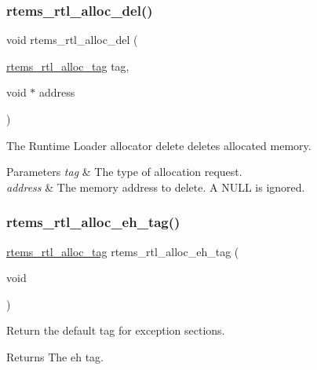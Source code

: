 \subsubsection{\texorpdfstring{rtems\_rtl\_alloc\_del()}{rtems\_rtl\_alloc\_del()}}
{\footnotesize\ttfamily void rtems\+\_\+rtl\+\_\+alloc\+\_\+del (\begin{DoxyParamCaption}\item[{\mbox{\hyperlink{rtl-allocator_8h_a445a8615118b7fc14005ab20583153fd}{rtems\+\_\+rtl\+\_\+alloc\+\_\+tag}}}]{tag,  }\item[{void $\ast$}]{address }\end{DoxyParamCaption})}

The Runtime Loader allocator delete deletes allocated memory.


\begin{DoxyParams}{Parameters}
{\em tag} & The type of allocation request. \\
\hline
{\em address} & The memory address to delete. A N\+U\+LL is ignored. \\
\hline
\end{DoxyParams}
\mbox{\label{rtl-allocator_8h_ac03f273707eb55ed34a1ebcee8fd4a10}} 
\subsubsection{\texorpdfstring{rtems\_rtl\_alloc\_eh\_tag()}{rtems\_rtl\_alloc\_eh\_tag()}}
{\footnotesize\ttfamily \mbox{\hyperlink{rtl-allocator_8h_a445a8615118b7fc14005ab20583153fd}{rtems\+\_\+rtl\+\_\+alloc\+\_\+tag}} rtems\+\_\+rtl\+\_\+alloc\+\_\+eh\+\_\+tag (\begin{DoxyParamCaption}\item[{void}]{ }\end{DoxyParamCaption})}

Return the default tag for exception sections.

\begin{DoxyReturn}{Returns}
The eh tag. 
\end{DoxyReturn}
\mbox{\label{rtl-allocator_8h_a33521c77270f8bcfc8b5bfd61cd8ab0c}} 
